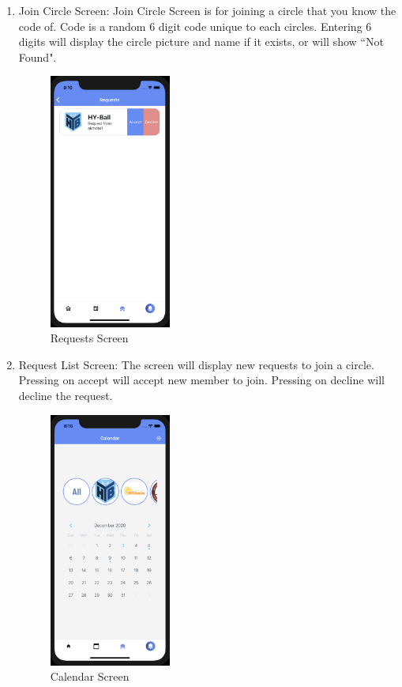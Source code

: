 \documentclass[conference]{IEEEtran}
\begin{document}
\begin{enumerate}
\begin{figure}[h]
    \end{figure}
    \item Join Circle Screen: Join Circle Screen is for joining a circle that you know the code of. Code is a random 6 digit code unique to each circles. Entering 6 digits will display the circle picture and name if it exists, or will show ``Not Found". 
    \begin{figure}[h]
        \centering
        \includegraphics[width=4cm]{images/requests.png}
        \caption{Requests Screen}
        \label{fig:my_label}
    \end{figure}
    \item Request List Screen: The screen will display new requests to join a circle. Pressing on accept will accept new member to join. Pressing on decline will decline the request.
    \begin{figure}[h]
        \centering
        \includegraphics[width=4cm]{images/calendar1.png}
        \caption{Calendar Screen}
        \label{fig:my_label}

\end{figure}
\end{enumerate}
\end{document}
